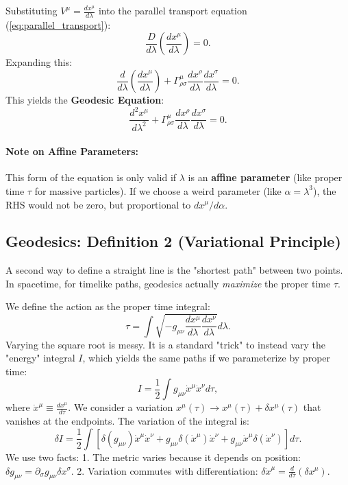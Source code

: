 \documentclass[11pt, a4paper]{report}
\begin{document}
Substituting \(V^\mu = \frac{dx^\mu}{d\lambda}\) into the parallel transport equation (\ref{eq:parallel_transport}):
\begin{equation}
\frac{D}{d\lambda} \left( \frac{dx^\mu}{d\lambda} \right) = 0.
\end{equation}
Expanding this:
\begin{equation}
\frac{d}{d\lambda} \left( \frac{dx^\mu}{d\lambda} \right) + \Gamma^\mu_{\rho\sigma} \frac{dx^\rho}{d\lambda} \frac{dx^\sigma}{d\lambda} = 0.
\end{equation}
This yields the \textbf{Geodesic Equation}:
\begin{equation}
\label{eq:geodesic_eq}
\frac{d^2 x^\mu}{d\lambda^2} + \Gamma^\mu_{\rho\sigma} \frac{dx^\rho}{d\lambda} \frac{dx^\sigma}{d\lambda} = 0.
\end{equation}
\paragraph{Note on Affine Parameters:} This form of the equation is only valid if \(\lambda\) is an \textbf{affine parameter} (like proper time \(\tau\) for massive particles). If we choose a weird parameter (like \(\alpha = \lambda^3\)), the RHS would not be zero, but proportional to \(dx^\mu/d\alpha\).

\subsection*{Geodesics: Definition 2 (Variational Principle)}
A second way to define a straight line is the "shortest path" between two points. In spacetime, for timelike paths, geodesics actually \emph{maximize} the proper time \(\tau\).

We define the action as the proper time integral:
\begin{equation}
\tau = \int \sqrt{-g_{\mu\nu} \frac{dx^\mu}{d\lambda} \frac{dx^\nu}{d\lambda}} d\lambda.
\end{equation}
Varying the square root is messy. It is a standard "trick" to instead vary the "energy" integral \(I\), which yields the same paths if we parameterize by proper time:
\begin{equation}
I = \frac{1}{2} \int g_{\mu\nu} \dot{x}^\mu \dot{x}^\nu d\tau,
\end{equation}
where \(\dot{x}^\mu \equiv \frac{dx^\mu}{d\tau}\). We consider a variation \(x^\mu(\tau) \to x^\mu(\tau) + \delta x^\mu(\tau)\) that vanishes at the endpoints.
The variation of the integral is:
\begin{equation}
\delta I = \frac{1}{2} \int \left[ \delta (g_{\mu\nu}) \dot{x}^\mu \dot{x}^\nu + g_{\mu\nu} \delta (\dot{x}^\mu) \dot{x}^\nu + g_{\mu\nu} \dot{x}^\mu \delta (\dot{x}^\nu) \right] d\tau.
\end{equation}
We use two facts:
1. The metric varies because it depends on position: \(\delta g_{\mu\nu} = \partial_\sigma g_{\mu\nu} \delta x^\sigma\).
2. Variation commutes with differentiation: \(\delta \dot{x}^\mu = \frac{d}{d\tau}(\delta x^\mu)\).
\end{document}

